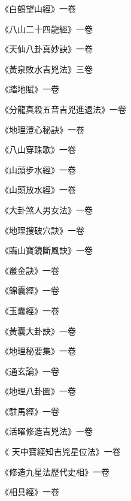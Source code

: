 \begin{pinyinscope}
 《白鶴望山經》一卷



 《八山二十四龍經》一卷



 《天仙八卦真妙訣》一卷



 《黃泉敗水吉兇法》三卷



 《踏地賦》一卷



 《分龍真殺五音吉兇進退法》一卷



 《地理澄心秘訣》一卷



 《八山穿珠歌》一卷



 《山頭步水經》一卷



 《山頭放水經》一卷



 《大卦煞人男女法》一卷



 《地理搜破穴訣》一卷



 《臨山寶鏡斷風訣》一卷



 《叢金訣》一卷



 《錦囊經》一卷



 《玉囊經》一卷



 《黃囊大卦訣》一卷



 《地理秘要集》一卷



 《通玄論》一卷



 《地理八卦圖》一卷



 《駐馬經》一卷



 《活曜修造吉兇法》一卷



 《
 天中寶經知吉兇星位法》一卷



 《修造九星法歷代史相》一卷



 《相具經》一卷




\end{pinyinscope}
